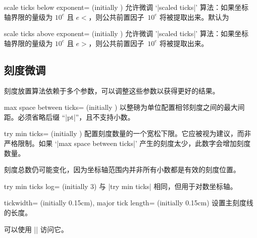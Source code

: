 \makeatletter
    \let\itsinitial=\pgfplots@scale@ticks@below@exponent
\makeatother
\begin{pgfplotskey}{scale ticks below exponent= (initially \itsinitial)}
    允许微调 `|scaled ticks|' 算法：如果坐标轴界限的量级为 $10^e$ 且 $e<$，则公共前置因子~$10^e$ 将被提取出来。默认为
\end{pgfplotskey}

\makeatletter
    \let\itsinitial=\pgfplots@scale@ticks@above@exponent
\makeatother
\begin{pgfplotskey}{scale ticks above exponent= (initially \itsinitial)}
    允许微调 '|scaled ticks|' 算法：如果坐标轴界限的量级为 $10^e$ 且 $e>$，则公共前置因子~$10^e$ 将被提取出来。
\end{pgfplotskey}


\subsection{刻度微调}

刻度放置算法依赖于多个参数，可以调整这些参数以获得更好的结果。

\begin{pgfplotskey}{max space between ticks= (initially \axisdefaulttickwidth)}
\label{maxspacebetweenticks}
    以整磅为单位配置相邻刻度之间的最大间距。必须省略后缀 ``|pt|''，且不支持小数。
\end{pgfplotskey}

\begin{pgfplotskey}{try min ticks= (initially \axisdefaulttryminticks)}
    配置刻度数量的一个宽松下限。它应被视为建议，而非严格限制。如果 `|max space between ticks|' 产生的刻度太少，此数字会增加刻度数量。

    刻度总数仍可能变化，因为坐标轴范围内并非所有小数都是有效的刻度位置。
\end{pgfplotskey}

\begin{pgfplotskey}{try min ticks log= (initially 3)}
    与 |try min ticks| 相同，但用于对数坐标轴。
\end{pgfplotskey}

\begin{pgfplotskeylist}{%
    tickwidth= (initially 0.15cm),
    major tick length= (initially 0.15cm)%
}
    设置主刻度线的长度。

    可以使用 || 访问它。
\end{pgfplotskeylist}

